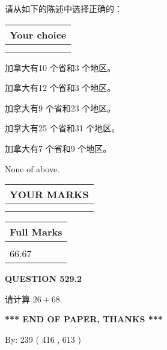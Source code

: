 \documentclass{ctexart}
\begin{document}
  
请从如下的陈述中选择正确的：
  
  
\noindent\hspace{3.0in} \begin{tabular}{|l|}
\hline
Your choice \\
\hline
 \\ 
 \\ 
\hline
\end{tabular}
  
  
 
 
加拿大有10 个省和3 个地区。
 
 
加拿大有12 个省和3 个地区。
 
 
加拿大有9 个省和23 个地区。
 
 
加拿大有25 个省和31 个地区。
 
 
加拿大有7 个省和9 个地区。
 
 
 None of above.
 
 
  
\vspace{0.2in}
  
\noindent\begin{tabular}{|l|}
\hline
 YOUR MARKS  \\
\hline
 \\ 
 \\ 
\hline
\end{tabular}
\hspace{0.05in} \begin{tabular}{|l|}
\hline
 Full Marks  \\
\hline
 \\ 
66.67 \\
\hline
\end{tabular}
{\textbf{\Large{QUESTION
529.2 
}}}
  
  
 
请计算 $ %
26 +  %
68 $.
 

 

 
   
   
 \vspace{0.2in}
 
   
   
   
   
\vspace{1.0in} 
{\textbf{\large{ *** END OF PAPER, THANKS *** }}} 
   
   
\hspace{1.0in} By: 
 239 ( 416 ,  613 )
   
\end{document}
